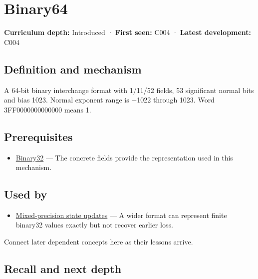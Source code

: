 \hypertarget{appendix-5078dfab64e6}{}\label{referencestart:appendix-5078dfab64e6}
\section{Binary64}\label{appendix-5078dfab64e6-binary64}

\textbf{Curriculum depth:} Introduced · \textbf{First seen:} C004 · \textbf{Latest development:} C004

\begin{allmightroledefinition}

\subsection{Definition and mechanism}\label{appendix-5078dfab64e6-definition-and-mechanism}

A 64-bit binary interchange format with 1/11/52 fields, 53 significant normal bits and bias 1023. Normal exponent range is −1022 through 1023. Word 3FF0000000000000 means 1.

\end{allmightroledefinition}

\subsection{Prerequisites}\label{appendix-5078dfab64e6-prerequisites}

\begin{itemize}
\tightlist
\item
  \hyperref[appendix-5057f9ad327f]{Binary32} --- The concrete fields provide the representation used in this mechanism.
\end{itemize}

\subsection{Used by}\label{appendix-5078dfab64e6-used-by}

\begin{itemize}
\tightlist
\item
  \hyperref[appendix-260182e617b7]{Mixed-precision state updates} --- A wider format can represent finite binary32 values exactly but not recover earlier loss.
\end{itemize}

Connect later dependent concepts here as their lessons arrive.

\subsection{Recall and next depth}\label{appendix-5078dfab64e6-recall-and-next-depth}

